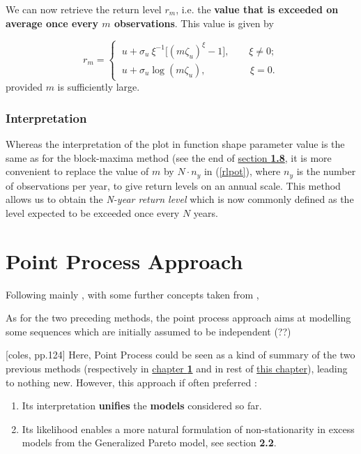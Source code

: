 We can now retrieve the return level $r_m$, i.e. the\textbf{ value that is exceeded on average once every $m$ observations}. 
This value is given by 

\begin{equation}\label{rlpot}
r_m=\begin{cases}
\ u+\sigma_u\ \xi^{-1}\Big[(m\zeta_u)^{\xi}-1\Big], \ \ \ \ \ \ \ \  \ \xi\neq 0;\\
\ u +\sigma_u \log(m\zeta_u), \ \ \ \ \ \ \ \ \  \ \ \ \ \ \ \quad \ \xi =0.
\end{cases}
\end{equation}
provided $m$ is sufficiently large.

\subsubsection*{Interpretation}

Whereas the interpretation of the plot in function shape parameter value is the same as for the block-maxima method  (see the end of \hyperref[rlplot]{section \textbf{1.8}}, it is more convenient to replace the value of $m$ by $N\cdot n_y$ in (\ref{rlpot}), where $n_y$ is the number of observations per year, to give return levels on an annual scale. This method allows us to obtain the\emph{ N-year return level} which is now commonly defined as the level expected to be exceeded once every $N$ years.


\section{Point Process Approach}\label{poissonproc}
Following mainly \cite{coles_introduction_2001}, with some further concepts taken from \cite{embrechts_modelling_1997} , 

As for the two preceding methods, the point process approach aims at modelling some sequences which are initially assumed to be independent (??)

[coles, pp.124] Here, Point Process could be seen as a kind of summary of the two previous methods (respectively in \hyperref[sec::1]{chapter \textbf{1}} and in rest of \hyperref[sec::2]{this chapter}), leading to nothing new. However, this approach if often preferred : %
\begin{enumerate}
	\item Its interpretation \textbf{unifies} the \textbf{models} considered so far.
	\item Its likelihood enables a more natural formulation of non-stationarity in excess models from the Generalized Pareto model, see section \textbf{2.2}.
\end{enumerate}

